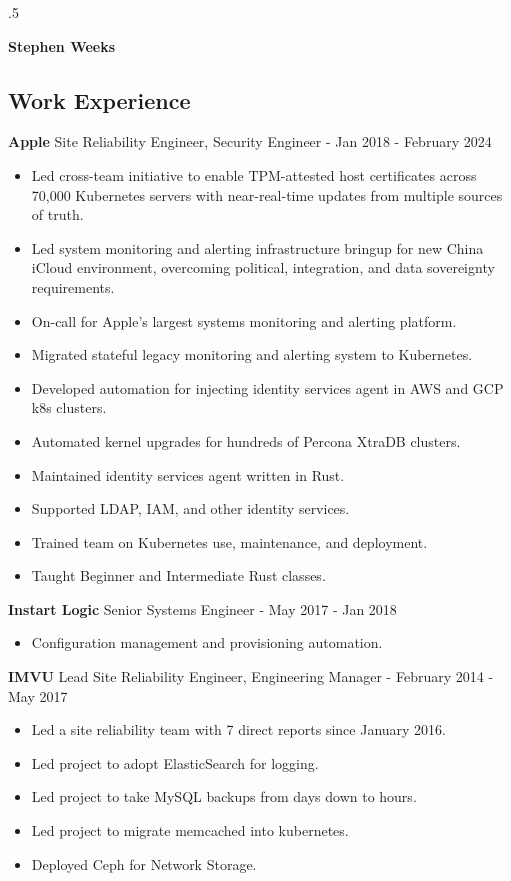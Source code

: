 \documentclass[line]{res}
\begin{document}
\moveleft.5\hoffset\centerline{\Huge\textbf{Stephen Weeks}}

\address{408.702.4448 tene@allalone.org}

\begin{resume}

\section{Work Experience}
\textbf{Apple} Site Reliability Engineer, Security Engineer - Jan 2018 - February 2024
\begin{itemize}
\item Led cross-team initiative to enable TPM-attested host certificates across 70,000 Kubernetes servers with near-real-time updates from multiple sources of truth.
\item Led system monitoring and alerting infrastructure bringup for new China iCloud environment, overcoming political, integration, and data sovereignty requirements.
\item On-call for Apple's largest systems monitoring and alerting platform.
\item Migrated stateful legacy monitoring and alerting system to Kubernetes.
\item Developed automation for injecting identity services agent in AWS and GCP k8s clusters.
\item Automated kernel upgrades for hundreds of Percona XtraDB clusters.
\item Maintained identity services agent written in Rust.
\item Supported LDAP, IAM, and other identity services.
\item Trained team on Kubernetes use, maintenance, and deployment.
\item Taught Beginner and Intermediate Rust classes.
\end{itemize}

\textbf{Instart Logic} Senior Systems Engineer - May 2017 - Jan 2018
\begin{itemize}
\item Configuration management and provisioning automation.
\end{itemize}

\textbf{IMVU} Lead Site Reliability Engineer, Engineering Manager - February 2014 - May 2017
\begin{itemize}
\item Led a site reliability team with 7 direct reports since January 2016.
\item Led project to adopt ElasticSearch for logging.
\item Led project to take MySQL backups from days down to hours.
\item Led project to migrate memcached into kubernetes.
\item Deployed Ceph for Network Storage.
\end{itemize}


\end{resume}
\end{document}
